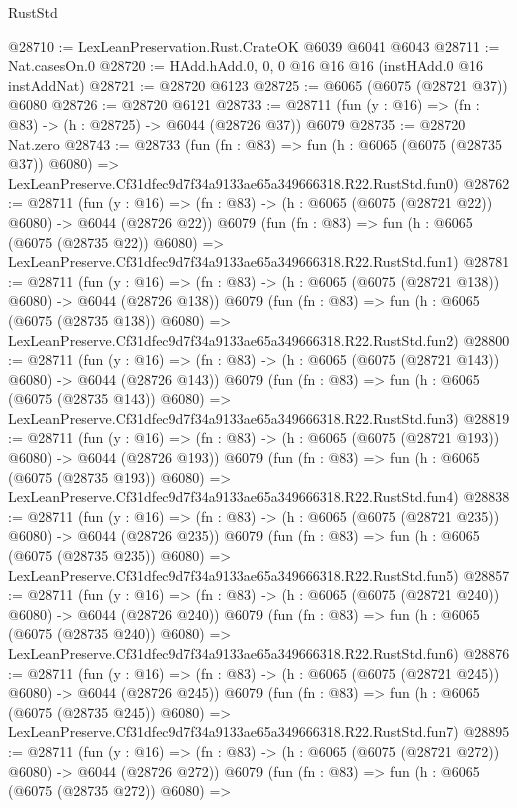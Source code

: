 \begin{lexlean}{RustStd}
\begin{coremodule}
@28710 := LexLeanPreservation.Rust.CrateOK @6039 @6041 @6043
@28711 := Nat.casesOn.{0}
@28720 := HAdd.hAdd.{0, 0, 0} @16 @16 @16 (instHAdd.{0} @16 instAddNat)
@28721 := @28720 @6123
@28725 := @6065 (@6075 (@28721 @37)) @6080
@28726 := @28720 @6121
@28733 := @28711 (fun (y : @16) => (fn : @83) -> (h : @28725) -> @6044 (@28726 @37)) @6079
@28735 := @28720 Nat.zero
@28743 := @28733
    (fun (fn : @83) =>
    fun (h : @6065 (@6075 (@28735 @37)) @6080) =>
    LexLeanPreserve.Cf31dfec9d7f34a9133ae65a349666318.R22.RustStd.fun0)
@28762 := @28711
    (fun (y : @16) => (fn : @83) -> (h : @6065 (@6075 (@28721 @22)) @6080) -> @6044 (@28726 @22))
    @6079
    (fun (fn : @83) =>
    fun (h : @6065 (@6075 (@28735 @22)) @6080) =>
    LexLeanPreserve.Cf31dfec9d7f34a9133ae65a349666318.R22.RustStd.fun1)
@28781 := @28711
    (fun (y : @16) => (fn : @83) -> (h : @6065 (@6075 (@28721 @138)) @6080) -> @6044 (@28726 @138))
    @6079
    (fun (fn : @83) =>
    fun (h : @6065 (@6075 (@28735 @138)) @6080) =>
    LexLeanPreserve.Cf31dfec9d7f34a9133ae65a349666318.R22.RustStd.fun2)
@28800 := @28711
    (fun (y : @16) => (fn : @83) -> (h : @6065 (@6075 (@28721 @143)) @6080) -> @6044 (@28726 @143))
    @6079
    (fun (fn : @83) =>
    fun (h : @6065 (@6075 (@28735 @143)) @6080) =>
    LexLeanPreserve.Cf31dfec9d7f34a9133ae65a349666318.R22.RustStd.fun3)
@28819 := @28711
    (fun (y : @16) => (fn : @83) -> (h : @6065 (@6075 (@28721 @193)) @6080) -> @6044 (@28726 @193))
    @6079
    (fun (fn : @83) =>
    fun (h : @6065 (@6075 (@28735 @193)) @6080) =>
    LexLeanPreserve.Cf31dfec9d7f34a9133ae65a349666318.R22.RustStd.fun4)
@28838 := @28711
    (fun (y : @16) => (fn : @83) -> (h : @6065 (@6075 (@28721 @235)) @6080) -> @6044 (@28726 @235))
    @6079
    (fun (fn : @83) =>
    fun (h : @6065 (@6075 (@28735 @235)) @6080) =>
    LexLeanPreserve.Cf31dfec9d7f34a9133ae65a349666318.R22.RustStd.fun5)
@28857 := @28711
    (fun (y : @16) => (fn : @83) -> (h : @6065 (@6075 (@28721 @240)) @6080) -> @6044 (@28726 @240))
    @6079
    (fun (fn : @83) =>
    fun (h : @6065 (@6075 (@28735 @240)) @6080) =>
    LexLeanPreserve.Cf31dfec9d7f34a9133ae65a349666318.R22.RustStd.fun6)
@28876 := @28711
    (fun (y : @16) => (fn : @83) -> (h : @6065 (@6075 (@28721 @245)) @6080) -> @6044 (@28726 @245))
    @6079
    (fun (fn : @83) =>
    fun (h : @6065 (@6075 (@28735 @245)) @6080) =>
    LexLeanPreserve.Cf31dfec9d7f34a9133ae65a349666318.R22.RustStd.fun7)
@28895 := @28711
    (fun (y : @16) => (fn : @83) -> (h : @6065 (@6075 (@28721 @272)) @6080) -> @6044 (@28726 @272))
    @6079
    (fun (fn : @83) =>
    fun (h : @6065 (@6075 (@28735 @272)) @6080) =>

\end{coremodule}
\end{lexlean}
